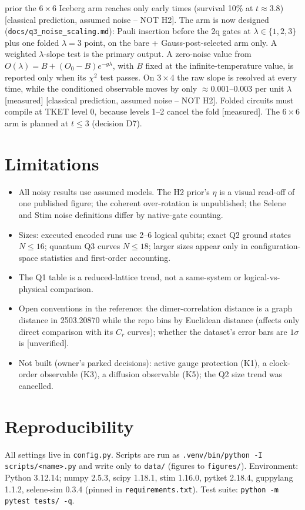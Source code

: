 \documentclass[11pt,a4paper]{article}
\newcommand{\tg}[1]{\textsf{\small[#1]}}
\newcommand{\mea}{\tg{measured}}
\newcommand{\unv}{\tg{unverified}}
\newcommand{\cp}{\tg{classical prediction, assumed noise -- NOT H2}}
\newcommand{\code}[1]{\nolinkurl{#1}}
\begin{document}
prior the $6\times6$ Iceberg arm reaches only early times (survival 10\% at $t\approx3.8$) \cp.
The arm is now designed (\code{docs/q3\_noise\_scaling.md}): Pauli insertion before the 2q gates at
$\lambda\in\{1,2,3\}$ plus one folded $\lambda=3$ point, on the bare + Gauss-post-selected arm only. A weighted
$\lambda$-slope test is the primary output. A zero-noise value from $O(\lambda)=B+(O_0-B)e^{-g\lambda}$, with $B$ fixed
at the infinite-temperature value, is reported only when its $\chi^2$ test passes. On $3\times4$ the raw slope is
resolved at every time, while the conditioned observable moves by only $\approx0.001$--$0.003$ per unit $\lambda$
\mea{} \cp. Folded circuits must compile at TKET level 0, because levels 1--2 cancel the fold \mea. The $6\times6$ arm is
planned at $t\le3$ (decision D7).

\section{Limitations}\label{sec:limits}
\begin{itemize}
\item All noisy results use assumed models. The H2 prior's $\eta$ is a visual read-off of one published figure; the
  coherent over-rotation is unpublished; the Selene and Stim noise definitions differ by native-gate counting.
\item Sizes: executed encoded runs use 2--6 logical qubits; exact Q2 ground states $N\le16$; quantum Q3 curves
  $N\le18$; larger sizes appear only in configuration-space statistics and first-order accounting.
\item The Q1 table is a reduced-lattice trend, not a same-system or logical-vs-physical comparison.
\item Open conventions in the reference: the dimer-correlation distance is a graph distance in 2503.20870 while the
  repo bins by Euclidean distance (affects only direct comparison with its $C_r$ curves); whether the dataset's
  error bars are $1\sigma$ is \unv.
\item Not built (owner's parked decisions): active gauge protection (K1), a clock-order observable (K3), a diffusion
  observable (K5); the Q2 size trend was cancelled.
\end{itemize}

\appendix
\section{Reproducibility}
All settings live in \code{config.py}. Scripts are run as \code{.venv/bin/python -I scripts/<name>.py} and write
only to \code{data/} (figures to \code{figures/}). Environment: Python 3.12.14; numpy 2.5.3, scipy 1.18.1, stim 1.16.0,
pytket 2.18.4, guppylang 1.1.2, selene-sim 0.3.4 (pinned in \code{requirements.txt}). Test suite:
\code{python -m pytest tests/ -q}.
\end{document}
